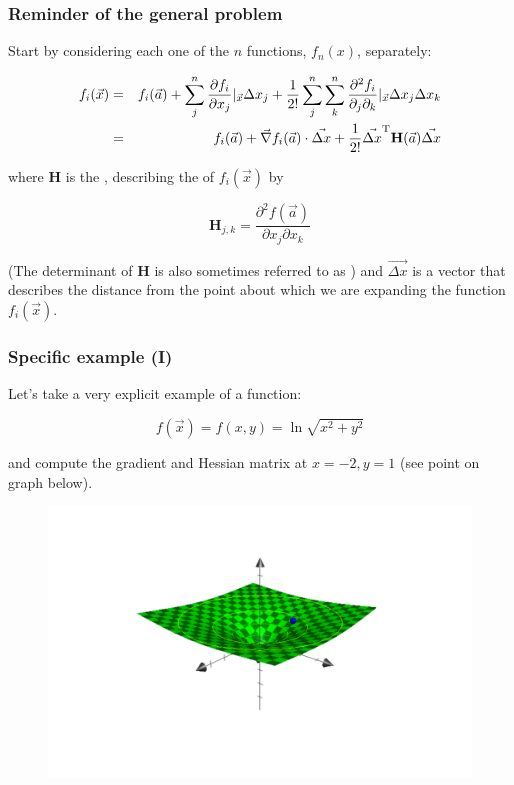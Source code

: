 \documentclass[hyperref={colorlinks=true}]{beamer}
\begin{document}
\begin{frame}%
  \frametitle{Reminder of the general problem}

  Start by considering each one of the $n$ functions, $f_n(x)$, separately:

  \begin{eqnarray}
    f_i(\vec{x}) &=& f_i(\vec{a} )+ \sum_j^n \frac{\partial f_i}{\partial x_j}|_{\vec{x}} \Delta x_j + \frac{1}{2!} \sum_j^n \sum_k^n \frac{\partial^2 f_i}{\partial_j \partial_k}|_{\vec{x}} \Delta x_j \Delta x_k \\
                 &=& f_i(\vec {a} )+ \vec{\nabla} f_i(\vec{a}) \cdot \vec{\Delta x} + \frac{1}{2!}\vec{\Delta x}^{\mathrm {T} }\mathbf {H} (\vec{a})\vec{\Delta x}
  \end{eqnarray}
  
  where $\mathbf {H}$ is the , describing the  of $f_i(\vec{x})$ by
  
  \begin{equation}
    {\mathbf {H} }_{j,k}={\frac {\partial ^{2}f(\vec{a})}{\partial x_{j}\partial x_{k}}}
  \end{equation}
  
  (The determinant of $\mathbf {H}$ is also sometimes referred to as ) and $\vec{\Delta x}$ is a vector that describes the distance from the point about which we are expanding the function $f_i(\vec{x})$.

\end{frame}


\begin{frame}%
  \frametitle{Specific example (I)}

  Let's take a very explicit example of a function:

  \begin{equation}
    f(\vec{x}) = f(x, y) = \ln \sqrt{x^2 + y^2} 
  \end{equation}
  
  and compute the gradient and Hessian matrix at $x=-2, y=1$ (see point on graph below).
    
  \begin{figure}
    \centering
    \includegraphics[width=0.65\columnwidth]{Function1-checkerboard.pdf}
  \end{figure}

\end{frame}
\end{document}
